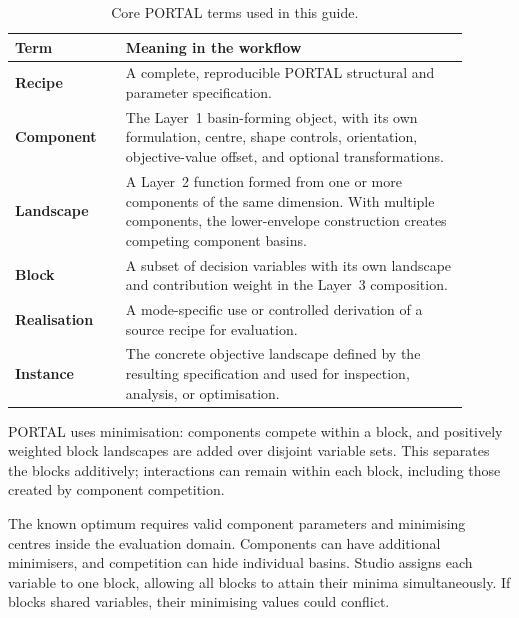 \documentclass[journal,onecolumn]{IEEEtran}
\begin{document}
\begin{table}[H]
\centering
\small
\caption{Core PORTAL terms used in this guide.}
\label{tab:manual:key-terms}

\begin{tabular}{@{}p{0.22\linewidth}p{0.68\linewidth}@{}}
\toprule
\textbf{Term} & \textbf{Meaning in the workflow} \\
\midrule

\textbf{Recipe} &
A complete, reproducible PORTAL structural and parameter specification. \\

\textbf{Component} &
The Layer~1 basin-forming object, with its own formulation, centre, shape controls, orientation, objective-value offset, and optional transformations. \\

\textbf{Landscape} &
A Layer~2 function formed from one or more components of the same dimension. With multiple components, the lower-envelope construction creates competing component basins. \\

\textbf{Block} &
A subset of decision variables with its own landscape and contribution weight in the Layer~3 composition. \\

\textbf{Realisation} &
A mode-specific use or controlled derivation of a source recipe for evaluation. \\

\textbf{Instance} &
The concrete objective landscape defined by the resulting specification and used for inspection, analysis, or optimisation. \\

\bottomrule
\end{tabular}
\end{table}

PORTAL uses minimisation: components compete within a block, and positively weighted block landscapes are added over disjoint variable sets. This separates the blocks additively; interactions can remain within each block, including those created by component competition.

The known optimum requires valid component parameters and minimising centres inside the evaluation domain. Components can have additional minimisers, and competition can hide individual basins. Studio assigns each variable to one block, allowing all blocks to attain their minima simultaneously. If blocks shared variables, their minimising values could conflict.
\end{document}
